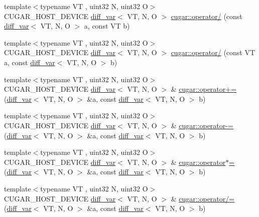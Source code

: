 \begin{DoxyCompactItemize}
\item 
{\footnotesize template$<$typename VT , uint32 N, uint32 O$>$ }\\C\+U\+G\+A\+R\+\_\+\+H\+O\+S\+T\+\_\+\+D\+E\+V\+I\+CE \hyperlink{structcugar_1_1diff__var}{diff\+\_\+var}$<$ VT, N, O $>$ \hyperlink{group___auto_diff_module_ga10ddb4877915c2ef70eb0555afa89169}{cugar\+::operator/} (const \hyperlink{structcugar_1_1diff__var}{diff\+\_\+var}$<$ VT, N, O $>$ a, const VT b)
\item 
{\footnotesize template$<$typename VT , uint32 N, uint32 O$>$ }\\C\+U\+G\+A\+R\+\_\+\+H\+O\+S\+T\+\_\+\+D\+E\+V\+I\+CE \hyperlink{structcugar_1_1diff__var}{diff\+\_\+var}$<$ VT, N, O $>$ \hyperlink{group___auto_diff_module_gac6d06651e3bd3b22fa763498852053dd}{cugar\+::operator/} (const VT a, const \hyperlink{structcugar_1_1diff__var}{diff\+\_\+var}$<$ VT, N, O $>$ b)
\item 
{\footnotesize template$<$typename VT , uint32 N, uint32 O$>$ }\\C\+U\+G\+A\+R\+\_\+\+H\+O\+S\+T\+\_\+\+D\+E\+V\+I\+CE \hyperlink{structcugar_1_1diff__var}{diff\+\_\+var}$<$ VT, N, O $>$ \& \hyperlink{group___auto_diff_module_ga93e04de8aa060923d0d031f83643b975}{cugar\+::operator+=} (\hyperlink{structcugar_1_1diff__var}{diff\+\_\+var}$<$ VT, N, O $>$ \&a, const \hyperlink{structcugar_1_1diff__var}{diff\+\_\+var}$<$ VT, N, O $>$ b)
\item 
{\footnotesize template$<$typename VT , uint32 N, uint32 O$>$ }\\C\+U\+G\+A\+R\+\_\+\+H\+O\+S\+T\+\_\+\+D\+E\+V\+I\+CE \hyperlink{structcugar_1_1diff__var}{diff\+\_\+var}$<$ VT, N, O $>$ \& \hyperlink{group___auto_diff_module_gab6673697063453e3a1805973fd2b3554}{cugar\+::operator-\/=} (\hyperlink{structcugar_1_1diff__var}{diff\+\_\+var}$<$ VT, N, O $>$ \&a, const \hyperlink{structcugar_1_1diff__var}{diff\+\_\+var}$<$ VT, N, O $>$ b)
\item 
{\footnotesize template$<$typename VT , uint32 N, uint32 O$>$ }\\C\+U\+G\+A\+R\+\_\+\+H\+O\+S\+T\+\_\+\+D\+E\+V\+I\+CE \hyperlink{structcugar_1_1diff__var}{diff\+\_\+var}$<$ VT, N, O $>$ \& \hyperlink{group___auto_diff_module_ga46821702fe79221bbcde83e9bd2bff20}{cugar\+::operator$\ast$=} (\hyperlink{structcugar_1_1diff__var}{diff\+\_\+var}$<$ VT, N, O $>$ \&a, const \hyperlink{structcugar_1_1diff__var}{diff\+\_\+var}$<$ VT, N, O $>$ b)
\item 
{\footnotesize template$<$typename VT , uint32 N, uint32 O$>$ }\\C\+U\+G\+A\+R\+\_\+\+H\+O\+S\+T\+\_\+\+D\+E\+V\+I\+CE \hyperlink{structcugar_1_1diff__var}{diff\+\_\+var}$<$ VT, N, O $>$ \& \hyperlink{group___auto_diff_module_ga3b4318e910a931b341f25f7918f98ec3}{cugar\+::operator/=} (\hyperlink{structcugar_1_1diff__var}{diff\+\_\+var}$<$ VT, N, O $>$ \&a, const \hyperlink{structcugar_1_1diff__var}{diff\+\_\+var}$<$ VT, N, O $>$ b)

\end{DoxyCompactItemize}
